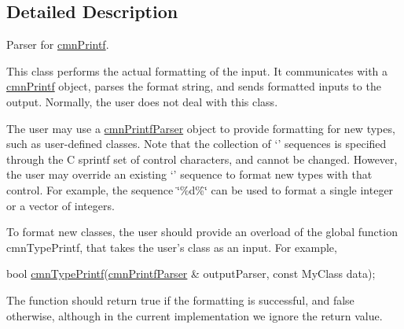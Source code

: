\subsection{Detailed Description}
Parser for \hyperlink{classcmn_printf}{cmn\-Printf}. 

This class performs the actual formatting of the input. It communicates with a \hyperlink{classcmn_printf}{cmn\-Printf} object, parses the format string, and sends formatted inputs to the output. Normally, the user does not deal with this class.

The user may use a \hyperlink{classcmn_printf_parser}{cmn\-Printf\-Parser} object to provide formatting for new types, such as user-\/defined classes. Note that the collection of `' sequences is specified through the C sprintf set of control characters, and cannot be changed. However, the user may override an existing `' sequence to format new types with that control. For example, the sequence \char`\"{}\%d\%\char`\"{} can be used to format a single integer or a vector of integers.

To format new classes, the user should provide an overload of the global function cmn\-Type\-Printf, that takes the user's class as an input. For example,


\begin{DoxyCode}
\textcolor{keywordtype}{bool} \hyperlink{cmn_printf_8h_ac406128072d3288a2fcb8654c6210b3b}{cmnTypePrintf}(\hyperlink{classcmn_printf_parser}{cmnPrintfParser} & outputParser, \textcolor{keyword}{const} MyClass data);
\end{DoxyCode}


The function should return true if the formatting is successful, and false otherwise, although in the current implementation we ignore the return value. 

